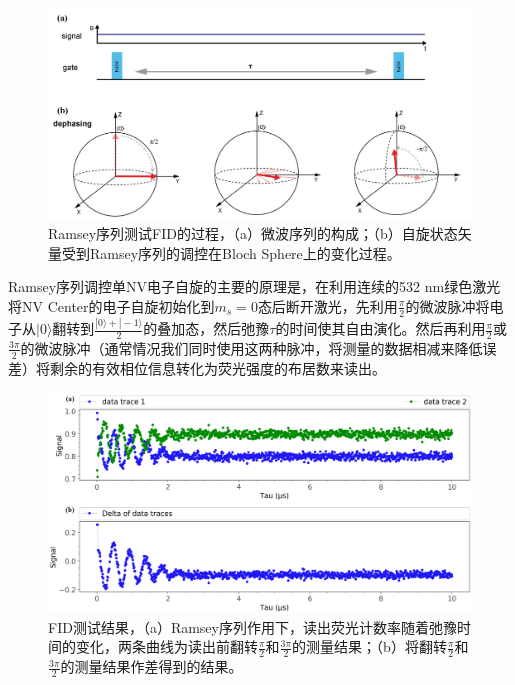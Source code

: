 \documentclass[type = bachelor, oneside]{whu-thesis}
\begin{document}
\begin{figure}
  \centering
  \includegraphics[width=1.0\textwidth]{figures/Chapter 2/FID_seq.png}
  \caption[Ramsey序列测试FID的过程]{Ramsey序列测试FID的过程，（a）微波序列的构成；（b）自旋状态矢量受到Ramsey序列的调控在Bloch Sphere上的变化过程\cite{新型扫描量子传感显微镜系统的研发与应用}。}
  \label{fig: FID_seq}
\end{figure}
Ramsey序列调控单NV电子自旋的主要的原理是，在利用连续的532 nm绿色激光将NV Center的电子自旋初始化到$m_s = 0$态后断开激光，先利用$\frac{\pi}{2}$的微波脉冲将电子从$|0\rangle$翻转到$\frac{|0\rangle+|-1\rangle}{2}$的叠加态，然后弛豫$\tau$的时间使其自由演化。然后再利用$\frac{\pi}{2}$或$\frac{3\pi}{2}$的微波脉冲（通常情况我们同时使用这两种脉冲，将测量的数据相减来降低误差）将剩余的有效相位信息转化为荧光强度的布居数来读出。

\begin{figure}
  \centering
  \includegraphics[width=1.0\textwidth]{figures/Chapter 2/FID Result.png}
  \caption[FID测试结果]{FID测试结果，（a）Ramsey序列作用下，读出荧光计数率随着弛豫时间的变化，两条曲线为读出前翻转$\frac{\pi}{2}$和$\frac{3\pi}{2}$的测量结果；（b）将翻转$\frac{\pi}{2}$和$\frac{3\pi}{2}$的测量结果作差得到的结果。}
  \label{fig: FID Result}
\end{figure}
\end{document}
